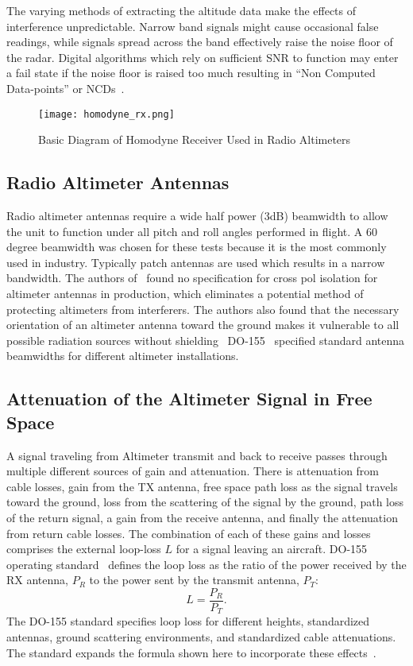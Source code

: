 The varying methods of extracting the altitude data make the effects of interference unpredictable. Narrow band signals might cause occasional false readings, while signals spread across the band effectively raise the noise floor of the radar. Digital algorithms which rely on sufficient SNR to function may enter a fail state if the noise floor is raised too much resulting in ``Non Computed Data-points'' or NCDs~\cite{noauthor_operational_2014}.
\begin{figure}
 \centering
 \texttt{[image: homodyne\_rx.png]}
 \caption{Basic Diagram of Homodyne Receiver Used in Radio Altimeters}
 \label{fig:homodyne}
\end{figure}
\subsection{Radio Altimeter Antennas}
Radio altimeter antennas require a wide half power (3dB) beamwidth to allow the unit to function under all pitch and roll angles performed in flight. A 60 degree beamwidth was chosen for these tests because it is the most commonly used in industry. Typically patch antennas are used which results in a narrow bandwidth. The authors of~\cite{noauthor_operational_2014} found no specification for cross pol isolation for altimeter antennas in production, which eliminates a potential method of protecting altimeters from interferers. The authors also found that the necessary orientation of an altimeter antenna toward the ground makes it vulnerable to all possible radiation sources without shielding~\cite{noauthor_operational_2014} DO-155~\cite{noauthor_minimum_1974} specified standard antenna beamwidths for different altimeter installations. 

\subsection{Attenuation of the Altimeter Signal in Free Space}
A signal traveling from Altimeter transmit and back to receive passes through multiple different sources of gain and attenuation. There is attenuation from cable losses, gain from the TX antenna, free space path loss as the signal travels toward the ground, loss from the scattering of the signal by the ground, path loss of the return signal, a gain from the receive antenna, and finally the attenuation from return cable losses. The combination of each of these gains and losses comprises the external loop-loss $L$ for a signal leaving an aircraft. DO-155 operating standard~\cite{noauthor_minimum_1974} defines the loop loss as the ratio of the power received by the RX antenna, $P_R$ to the power sent by the transmit antenna, $P_T$:
$$ L = \frac{P_R}{P_T}.$$
The DO-155 standard specifies loop loss for different heights, standardized antennas,  ground scattering environments, and standardized cable attenuations. The standard expands the formula shown here to incorporate these effects~\cite{noauthor_minimum_1974}.


